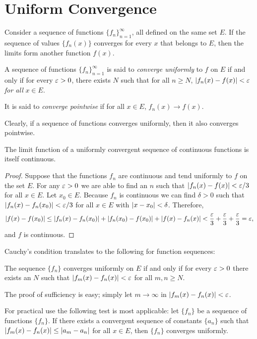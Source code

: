 \section{Uniform Convergence}
Consider a sequence of functions $\{f_n\}_{n=1}^{\infty}$, all defined on the same set $E$. If the sequence of values $\{f_n(x)\}$ converges for every $x$ that belongs to $E$, then the limits form another function $f(x)$.

\begin{definition}
	A sequence of functions $\{f_n\}_{n=1}^{\infty}$ is said to \textit{converge uniformly} to $f$ on $E$ if and only if for every $\varepsilon>0$, there exists $N$ such that for all $n \ge N$, $\lvert f_n(x)-f(x) \rvert<\varepsilon$ \textit{for all} $x \in E$.
	
	It is said to \textit{converge pointwise} if for all $x \in E$, $f_n(x) \rightarrow f(x)$.
\end{definition}

Clearly, if a sequence of functions converges uniformly, then it also converges pointwise.

\begin{proposition}
	The limit function of a uniformly convergent sequence of continuous functions is itself continuous.
\end{proposition}
\begin{proof}
	Suppose that the functions $f_n$ are continuous and tend uniformly to $f$ on the set $E$. For any $\varepsilon>0$ we are able to find an $n$ such that $\lvert f_n(x)-f(x) \rvert<\varepsilon/3$ for all $x \in E$. Let $x_0 \in E$. Because $f_n$ is continuous we can find $\delta>0$ such that $\lvert f_n(x)-f_n(x_0) \rvert<\varepsilon/3$ for all $x \in E$ with $\lvert x-x_0 \rvert<\delta$. Therefore, $$\lvert f(x)-f(x_0) \rvert \le \lvert f_n(x)-f_n(x_0) \rvert+\lvert f_n(x_0)-f(x_0) \rvert+\lvert f(x)-f_n(x) \rvert<\dfrac{\varepsilon}{3}+\dfrac{\varepsilon}{3}+\dfrac{\varepsilon}{3}=\varepsilon,$$ and $f$ is continuous.
\end{proof}

Cauchy's condition translates to the following for function sequences:
\begin{proposition}
	The sequence $\{f_n\}$ converges uniformly on $E$ if and only if for every $\varepsilon>0$ there exists an $N$ such that $\lvert f_m(x)-f_n(x) \rvert<\varepsilon$ for all $m,n \ge N$.
\end{proposition}

The proof of sufficiency is easy; simply let $m \rightarrow \infty$ in $\lvert f_m(x)-f_n(x) \rvert<\varepsilon$.

For practical use the following test is most applicable: let $\{f_n\}$ be a sequence of functions $\{f_n\}$. If there exists a convergent sequence of constants $\{a_n\}$ such that $\lvert f_m(x)-f_n(x) \rvert \le \lvert a_m-a_n \rvert$ for all $x \in E$, then $\{f_n\}$ converges uniformly.

